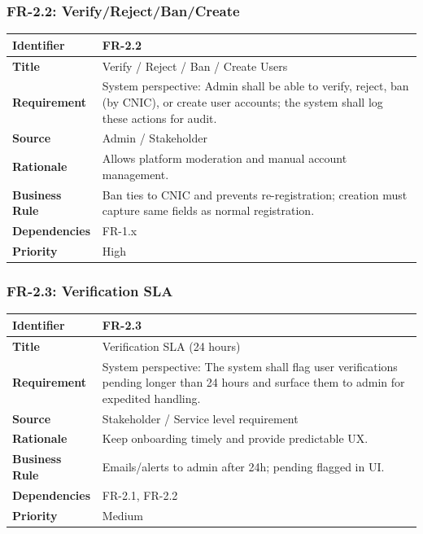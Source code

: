 \subsubsection{FR-2.2: Verify/Reject/Ban/Create}

\begin{longtable}{|p{3cm}|p{12cm}|}
\hline
\rowcolor{lightgray!30}
\textbf{Identifier} & FR-2.2 \\
\hline
\textbf{Title} & Verify / Reject / Ban / Create Users \\
\hline
\textbf{Requirement} & System perspective: Admin shall be able to verify, reject, ban (by CNIC), or create user accounts; the system shall log these actions for audit. \\
\hline
\textbf{Source} & Admin / Stakeholder \\
\hline
\textbf{Rationale} & Allows platform moderation and manual account management. \\
\hline
\textbf{Business Rule} & Ban ties to CNIC and prevents re-registration; creation must capture same fields as normal registration. \\
\hline
\textbf{Dependencies} & FR-1.x \\
\hline
\textbf{Priority} & High \\
\hline
\end{longtable}

\subsubsection{FR-2.3: Verification SLA}

\begin{longtable}{|p{3cm}|p{12cm}|}
\hline
\rowcolor{lightgray!30}
\textbf{Identifier} & FR-2.3 \\
\hline
\textbf{Title} & Verification SLA (24 hours) \\
\hline
\textbf{Requirement} & System perspective: The system shall flag user verifications pending longer than 24 hours and surface them to admin for expedited handling. \\
\hline
\textbf{Source} & Stakeholder / Service level requirement \\
\hline
\textbf{Rationale} & Keep onboarding timely and provide predictable UX. \\
\hline
\textbf{Business Rule} & Emails/alerts to admin after 24h; pending flagged in UI. \\
\hline
\textbf{Dependencies} & FR-2.1, FR-2.2 \\
\hline
\textbf{Priority} & Medium \\
\hline
\end{longtable}

